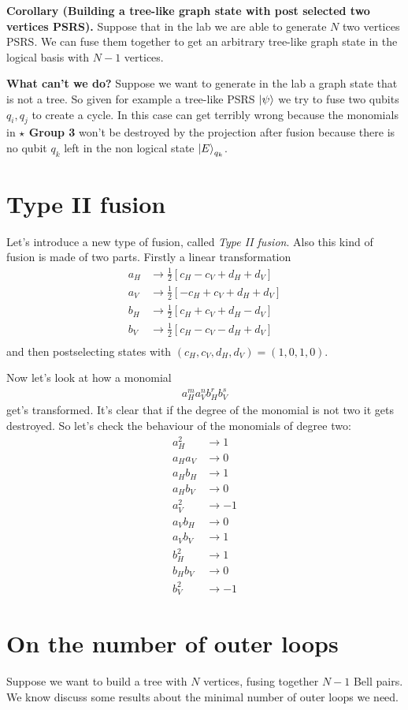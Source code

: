 \documentclass{article}
\begin{document}
\textbf{Corollary (Building a tree-like graph state with post selected two vertices PSRS).} Suppose that in the lab we are able to generate $N$ two vertices PSRS. We can fuse them together to get an arbitrary tree-like graph state in the logical basis with $N-1$ vertices.

\textbf{What can't we do?} Suppose we want to generate in the lab a graph state that is not a tree. So given for example a tree-like PSRS $\ket{\psi}$ we try to fuse two qubits $q_i, q_j$ to create a cycle. In this case can get terribly wrong because the monomials in \textbf{$\star$ Group 3} won't be destroyed by the projection after fusion because there is no qubit $q_k$ left in the non logical state $\ket{E}_{q_k}$.

\section{Type II fusion}
Let's introduce a new type of fusion, called \textit{Type II fusion}. Also this kind of fusion is made of two parts. Firstly a linear transformation
\begin{align*}
   a_H &\rightarrow \frac{1}{2}\left[c_H-c_V+d_H+d_V\right] \\
   a_V &\rightarrow \frac{1}{2}\left[-c_H+c_V+d_H+d_V\right] \\
   b_H &\rightarrow \frac{1}{2}\left[c_H+c_V+d_H-d_V\right] \\
   b_V &\rightarrow \frac{1}{2}\left[c_H-c_V-d_H+d_V\right] \\
\end{align*}
and then postselecting states with $(c_H, c_V, d_H, d_V) = (1, 0, 1, 0)$.

Now let's look at how a monomial
\begin{align*}
    a_H^m a_V^n b_H^r b_V^s
\end{align*}
get's transformed. It's clear that if the degree of the monomial is not two it gets destroyed. So let's check the behaviour of the monomials of degree two:
\begin{align*}
    a_H^{2} &\rightarrow 1\\
    a_Ha_V  &\rightarrow 0\\
    a_Hb_H  &\rightarrow 1\\
    a_Hb_V  &\rightarrow 0\\
    a_V^{2} &\rightarrow -1\\
    a_Vb_H  &\rightarrow 0\\
    a_Vb_V  &\rightarrow 1\\
    b_H^{2} &\rightarrow 1\\
    b_H b_V &\rightarrow 0\\
    b_V^{2} &\rightarrow -1
\end{align*}

\section{On the number of outer loops}
Suppose we want to build a tree with $N$ vertices, fusing together $N-1$ Bell pairs. We know discuss some results about the minimal number of outer loops we need.

\textbf{}
\end{document}
